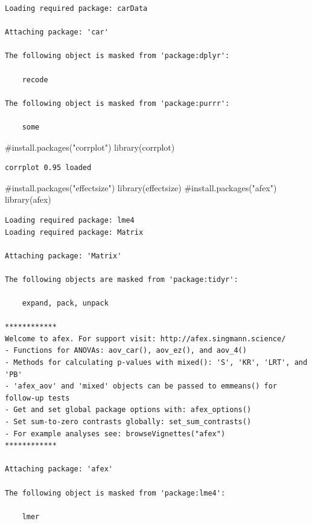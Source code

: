 \documentclass[
  letterpaper,
  DIV=11,
  numbers=noendperiod]{scrartcl}
\newenvironment{Shaded}{\begin{snugshade}}{\end{snugshade}}
\newcommand{\CommentTok}[1]{\textcolor[rgb]{0.37,0.37,0.37}{#1}}
\newcommand{\FunctionTok}[1]{\textcolor[rgb]{0.28,0.35,0.67}{#1}}
\newcommand{\NormalTok}[1]{\textcolor[rgb]{0.00,0.23,0.31}{#1}}
\begin{document}
\begin{verbatim}
Loading required package: carData

Attaching package: 'car'

The following object is masked from 'package:dplyr':

    recode

The following object is masked from 'package:purrr':

    some
\end{verbatim}

\begin{Shaded}
\begin{Highlighting}[]
\CommentTok{\#install.packages("corrplot")}
\FunctionTok{library}\NormalTok{(corrplot)}
\end{Highlighting}
\end{Shaded}

\begin{verbatim}
corrplot 0.95 loaded
\end{verbatim}

\begin{Shaded}
\begin{Highlighting}[]
\CommentTok{\#install.packages("effectsize")}
\FunctionTok{library}\NormalTok{(effectsize)}
\CommentTok{\#install.packages("afex")}
\FunctionTok{library}\NormalTok{(afex)}
\end{Highlighting}
\end{Shaded}

\begin{verbatim}
Loading required package: lme4
Loading required package: Matrix

Attaching package: 'Matrix'

The following objects are masked from 'package:tidyr':

    expand, pack, unpack

************
Welcome to afex. For support visit: http://afex.singmann.science/
- Functions for ANOVAs: aov_car(), aov_ez(), and aov_4()
- Methods for calculating p-values with mixed(): 'S', 'KR', 'LRT', and 'PB'
- 'afex_aov' and 'mixed' objects can be passed to emmeans() for follow-up tests
- Get and set global package options with: afex_options()
- Set sum-to-zero contrasts globally: set_sum_contrasts()
- For example analyses see: browseVignettes("afex")
************

Attaching package: 'afex'

The following object is masked from 'package:lme4':

    lmer
\end{verbatim}
\end{document}
